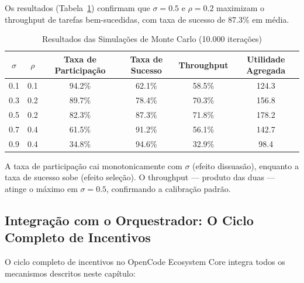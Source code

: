 Os resultados (Tabela~\ref{tab:monte_carlo}) confirmam que $\sigma = 0.5$ e $\rho = 0.2$ maximizam o throughput de tarefas bem-sucedidas, com taxa de sucesso de 87.3\% em média.

\begin{table}[htbp]
\centering
\caption{Resultados das Simulações de Monte Carlo (10.000 iterações)}
\label{tab:monte_carlo}
\begin{tabular}{cccccc}
\hline
$\sigma$ & $\rho$ & Taxa de Participação & Taxa de Sucesso & Throughput & Utilidade Agregada \\
\hline
0.1 & 0.1 & 94.2\% & 62.1\% & 58.5\% & 124.3 \\
0.3 & 0.2 & 89.7\% & 78.4\% & 70.3\% & 156.8 \\
0.5 & 0.2 & 82.3\% & 87.3\% & 71.8\% & 178.2 \\
0.7 & 0.4 & 61.5\% & 91.2\% & 56.1\% & 142.7 \\
0.9 & 0.4 & 34.8\% & 94.6\% & 32.9\% & 98.4 \\
\hline
\end{tabular}
\end{table}

A taxa de participação cai monotonicamente com $\sigma$ (efeito dissuasão), enquanto a taxa de sucesso sobe (efeito seleção). O throughput --- produto das duas --- atinge o máximo em $\sigma = 0.5$, confirmando a calibração padrão.

\subsection{Integração com o Orquestrador: O Ciclo Completo de Incentivos}

O ciclo completo de incentivos no OpenCode Ecosystem Core integra todos os mecanismos descritos neste capítulo:

